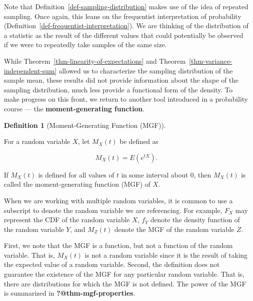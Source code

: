 \documentclass[
  letterpaper,
  DIV=11,
  numbers=noendperiod]{scrreprt}
\theoremstyle{plain}
\theoremstyle{definition}
\newtheorem{definition}{Definition}[chapter]
\theoremstyle{definition}
\theoremstyle{remark}
\begin{document}
Note that Definition~\ref{def-sampling-distribution} makes use of the
idea of repeated sampling. Once again, this leans on the frequentist
interpretation of probability
(Definition~\ref{def-frequentist-interpretation}). We are thinking of
the distribution of a statistic as the result of the different values
that could potentially be observed if we were to repeatedly take samples
of the same size.

While Theorem~\ref{thm-linearity-of-expectations} and
Theorem~\ref{thm-variance-independent-sum} allowed us to characterize
the sampling distribution of the sample mean, these results did not
provide information about the shape of the sampling distribution, much
less provide a functional form of the density. To make progress on this
front, we return to another tool introduced in a probability course ---
the \textbf{moment-generating function}.

\begin{definition}[Moment-Generating Function
(MGF)]\protect\hypertarget{def-mgf}{}\label{def-mgf}

For a random variable \(X\), let \(M_X(t)\) be defined as

\[M_X(t) = E\left(e^{tX}\right).\]

If \(M_X(t)\) is defined for all values of \(t\) in some interval about
0, then \(M_X(t)\) is called the moment-generating function (MGF) of
\(X\).

\end{definition}

\begin{tcolorbox}[enhanced jigsaw, toprule=.15mm, left=2mm, title=\textcolor{quarto-callout-note-color}{\faInfo}\hspace{0.5em}{Note}, opacityback=0, toptitle=1mm, leftrule=.75mm, colbacktitle=quarto-callout-note-color!10!white, opacitybacktitle=0.6, titlerule=0mm, breakable, colframe=quarto-callout-note-color-frame, arc=.35mm, coltitle=black, bottomtitle=1mm, rightrule=.15mm, colback=white, bottomrule=.15mm]

When we are working with multiple random variables, it is common to use
a subscript to denote the random variable we are referencing. For
example, \(F_X\) may represent the CDF of the random variable \(X\),
\(f_Y\) denote the density function of the random variable \(Y\), and
\(M_Z(t)\) denote the MGF of the random variable \(Z\).

\end{tcolorbox}

First, we note that the MGF is a function, but not a function of the
random variable. That is, \(M_X(t)\) is not a random variable since it
is the result of taking the expected value of a random variable. Second,
the definition does not guarantee the existence of the MGF for any
particular random variable. That is, there are distributions for which
the MGF is not defined. The power of the MGF is summarized in
\textbf{?@thm-mgf-properties}.
\end{document}
